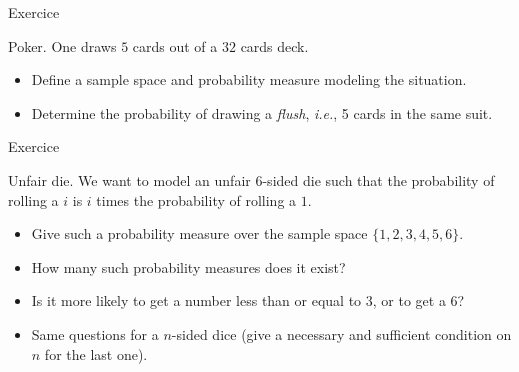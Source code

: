 \documentclass{beamer}
\begin{document}
\begin{frame}{Exercice}
  \begin{exampleblock}{Poker.}
    One draws $5$ cards out of a $32$ cards deck.
    \begin{itemize}
    \item Define a sample space and probability measure modeling the situation.
    \item Determine the probability of drawing a \emph{flush}, \emph{i.e.}, 5 cards in the same suit.
    \end{itemize}
    
  \end{exampleblock}
\end{frame}
  
\begin{frame}{Exercice}
  \begin{exampleblock}{Unfair die.}
    We want to model an unfair $6$-sided die such that the probability of rolling a $i$ is $i$ times the probability of rolling a $1$.
    \begin{itemize}
    \item Give such a probability measure over the sample space $\{ 1,2,3,4,5,6 \}$.
    \item How many such probability measures does it exist?
    \item Is it more likely to get a number less than or equal to $3$, or to get a $6$?
    \item Same questions for a $n$-sided dice (give a necessary and sufficient condition on $n$ for the last one).
    \end{itemize}
  \end{exampleblock}
  
\end{frame}
\end{document}
